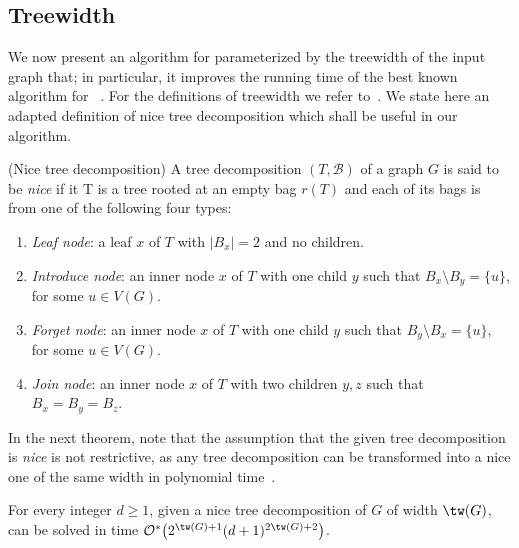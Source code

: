 \subsection{Treewidth}

We now present an algorithm for  parameterized by the treewidth of the input graph that; in particular, it improves the running time of the best known algorithm for ~\cite{matching_cut_structural}.
For the definitions of treewidth we refer to~\cite{treewidth,CyganFKLMPPS15}.
We state here an adapted definition of nice tree decomposition which shall be useful in our algorithm.

\begin{definition}{(Nice tree decomposition)}
    A tree decomposition $(T, \mathcal{B})$ of a graph $G$ is said to be \emph{nice} if it T is a tree rooted at an empty bag $r(T)$ and each of its bags is from one of the following four types:
    \begin{enumerate}
        \item \textit{Leaf node}: a leaf $x$ of $T$ with $|B_x| = 2$ and no children.
        \item \textit{Introduce node}: an inner node $x$ of $T$ with one child $y$ such that $B_x \setminus B_y = \{u\}$, for some $u \in V(G)$.
        \item \textit{Forget node}: an inner node $x$ of $T$ with one child $y$ such that $B_y \setminus B_x = \{u\}$, for some $u \in V(G)$.
        \item \textit{Join node}: an inner node $x$ of $T$ with two children $y,z$ such that $B_x = B_y = B_z$.
    \end{enumerate}
\end{definition}


In the next theorem, note that the assumption that the given tree decomposition is {\sl nice} is not restrictive, as any tree decomposition can be transformed into a nice one of the same width in polynomial time~\cite{Klo94}.

\begin{theorem}\label{thm:treewidth}
    For every integer $d \geq 1$, given a nice tree decomposition of $G$ of width $\tw(G)$,  can be solved in time $\bigOs{2^{\tw(G)+1}(d+1)^{2\tw(G) + 2}}$.
\end{theorem}


